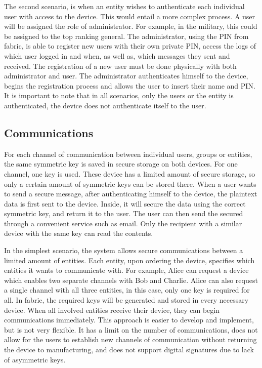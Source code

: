 The second scenario, is when an entity wishes to authenticate each individual user with access to the device. 
This would entail a more complex process. A user will be assigned the role of administrator. For example, in the military, this could be assigned to the top ranking general. The administrator, using the \ac{PIN} from fabric, is able to register new users with their own private \ac{PIN}, access the logs of which user logged in and when, as well as, which messages they sent and received.
The registration of a new user must be done physically with both administrator and user. The administrator authenticates himself to the device, begins the registration process and allows the user to insert their name and \ac{PIN}.
It is important to note that in all scenarios, only the users or the entity is authenticated, the device does not authenticate itself to the user.

\subsection{Communications}\label{chap:problem:scenarios:comms}

For each channel of communication between individual users, groups or entities, the same symmetric key is saved in secure storage on both devices. For one channel, one key is used.
These device has a limited amount of secure storage, so only a certain amount of symmetric keys can be stored there.
When a user wants to send a secure message, after authenticating himself to the device, the plaintext data is first sent to the device. Inside, it will secure the data using the correct symmetric key, and return it to the user. The user can then send the secured through a convenient service such as email. Only the recipient with a similar device with the same key can read the contents.

In the simplest scenario, the system allows secure communications between a limited amount of entities. Each entity, upon ordering the device, specifies which entities it wants to communicate with. For example, Alice can request a device which enables two separate channels with Bob and Charlie. Alice can also request a single channel with all three entities, in this case, only one key is required for all.
In fabric, the required keys will be generated and stored in every necessary device. When all involved entities receive their device, they can begin communications immediately.
This approach is easier to develop and implement, but is not very flexible. It has a limit on the number of communications, does not allow for the users to establish new channels of communication without returning the device to manufacturing, and does not support digital signatures due to lack of asymmetric keys.


